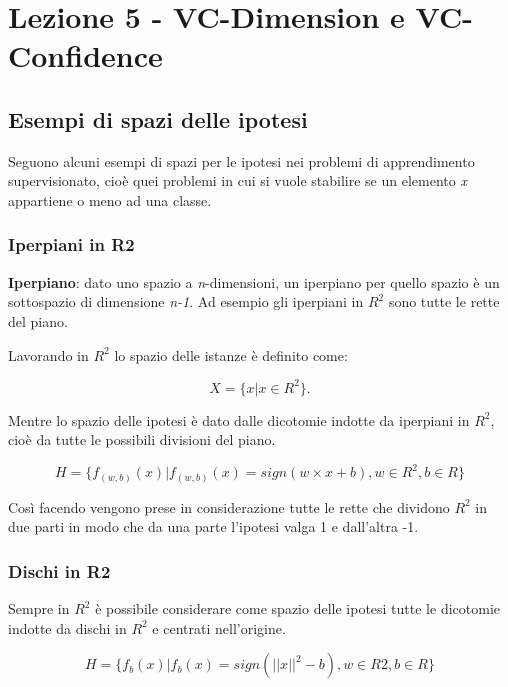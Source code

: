 \section{Lezione 5 - VC-Dimension e VC-Confidence}\label{lezione-5-vc-dimension-e-vc-confidence}

\subsection{Esempi di spazi delle ipotesi}\label{esempi-di-spazi-delle-ipotesi}

Seguono alcuni esempi di spazi per le ipotesi nei problemi di
apprendimento supervisionato, cioè quei problemi in cui si vuole
stabilire se un elemento \emph{x} appartiene o meno ad una classe.

\subsubsection{Iperpiani in R2}\label{iperpiani-in-r2}

\textbf{Iperpiano}: dato uno spazio a \emph{n}-dimensioni, un iperpiano
per quello spazio è un sottospazio di dimensione \emph{n-1}. Ad esempio gli
iperpiani in $R^2$ sono tutte le rette del piano.

Lavorando in $R^2$ lo spazio delle istanze è definito come:

$$
X = \{x | x \in R^2\}.
$$

Mentre lo spazio delle ipotesi è dato dalle dicotomie indotte da iperpiani in $R^2$, cioè da tutte le possibili divisioni del piano.

$$
H = \{f_{(w,b)}(x) | f_{(w,b)}(x) = sign(w \times x + b), w \in R^2, b \in R\}
$$

Così facendo vengono prese in considerazione tutte le rette che dividono
$R^2$ in due parti in modo che da una parte l'ipotesi valga 1 e dall'altra
-1.

\subsubsection{Dischi in R2}\label{dischi-in-r2}

Sempre in $R^2$ è possibile considerare come spazio delle ipotesi tutte le
dicotomie indotte da dischi in $R^2$ e centrati nell'origine.

$$
H = \{f_b(x) | f_b(x) = sign(||x||^2 - b), w \in R2, b \in R\}
$$

